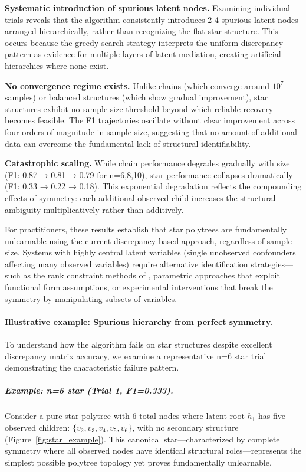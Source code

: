 \documentclass[11pt,a4paper]{article}
\numberwithin{equation}{section}
\begin{document}
\textbf{Systematic introduction of spurious latent nodes.} Examining individual trials reveals that the algorithm consistently introduces 2-4 spurious latent nodes arranged hierarchically, rather than recognizing the flat star structure. This occurs because the greedy search strategy interprets the uniform discrepancy pattern as evidence for multiple layers of latent mediation, creating artificial hierarchies where none exist.

\textbf{No convergence regime exists.} Unlike chains (which converge around $10^7$ samples) or balanced structures (which show gradual improvement), star structures exhibit no sample size threshold beyond which reliable recovery becomes feasible. The F1 trajectories oscillate without clear improvement across four orders of magnitude in sample size, suggesting that no amount of additional data can overcome the fundamental lack of structural identifiability.

\textbf{Catastrophic scaling.} While chain performance degrades gradually with size (F1: 0.87 → 0.81 → 0.79 for n=6,8,10), star performance collapses dramatically (F1: 0.33 → 0.22 → 0.18). This exponential degradation reflects the compounding effects of symmetry: each additional observed child increases the structural ambiguity multiplicatively rather than additively.

For practitioners, these results establish that star polytrees are fundamentally unlearnable using the current discrepancy-based approach, regardless of sample size. Systems with highly central latent variables (single unobserved confounders affecting many observed variables) require alternative identification strategies—such as the rank constraint methods of \citet{cai:etal:2024:rank}, parametric approaches that exploit functional form assumptions, or experimental interventions that break the symmetry by manipulating subsets of variables.

\paragraph{Illustrative example: Spurious hierarchy from perfect symmetry.} To understand how the algorithm fails on star structures despite excellent discrepancy matrix accuracy, we examine a representative n=6 star trial demonstrating the characteristic failure pattern.

\subparagraph{Example: n=6 star (Trial 1, F1=0.333).} Consider a pure star polytree with 6 total nodes where latent root $h_1$ has five observed children: $\{v_2, v_3, v_4, v_5, v_6\}$, with no secondary structure (Figure~\ref{fig:star_example}). This canonical star—characterized by complete symmetry where all observed nodes have identical structural roles—represents the simplest possible polytree topology yet proves fundamentally unlearnable.
\end{document}
